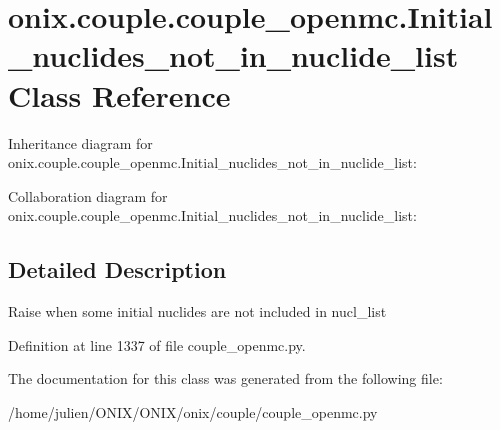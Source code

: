 \hypertarget{classonix_1_1couple_1_1couple__openmc_1_1Initial__nuclides__not__in__nuclide__list}{}\section{onix.\+couple.\+couple\+\_\+openmc.\+Initial\+\_\+nuclides\+\_\+not\+\_\+in\+\_\+nuclide\+\_\+list Class Reference}
\label{classonix_1_1couple_1_1couple__openmc_1_1Initial__nuclides__not__in__nuclide__list}


Inheritance diagram for onix.\+couple.\+couple\+\_\+openmc.\+Initial\+\_\+nuclides\+\_\+not\+\_\+in\+\_\+nuclide\+\_\+list\+:


Collaboration diagram for onix.\+couple.\+couple\+\_\+openmc.\+Initial\+\_\+nuclides\+\_\+not\+\_\+in\+\_\+nuclide\+\_\+list\+:


\subsection{Detailed Description}
\begin{DoxyVerb}Raise when some initial nuclides are not included in nucl_list \end{DoxyVerb}
 

Definition at line 1337 of file couple\+\_\+openmc.\+py.



The documentation for this class was generated from the following file\+:\begin{DoxyCompactItemize}
\item 
/home/julien/\+O\+N\+I\+X/\+O\+N\+I\+X/onix/couple/couple\+\_\+openmc.\+py\end{DoxyCompactItemize}
